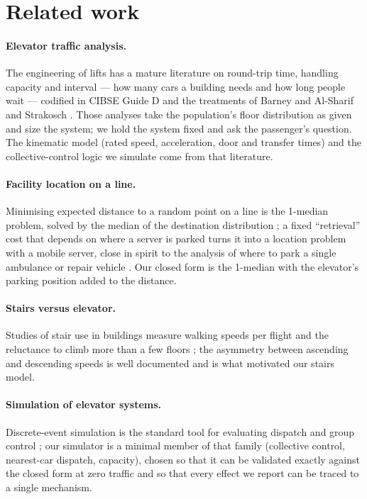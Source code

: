 \section{Related work}
\label{sec:related}

\paragraph{Elevator traffic analysis.} The engineering of lifts has a mature
literature on round-trip time, handling capacity and interval --- how many
cars a building needs and how long people wait --- codified in CIBSE Guide D
\cite{cibse2020guide} and the treatments of Barney and Al-Sharif
\cite{barney2015elevator} and Strakosch \cite{strakosch2010vertical}. Those
analyses take the population's floor distribution as given and size the
system; we hold the system fixed and ask the passenger's question. The
kinematic model (rated speed, acceleration, door and transfer times) and the
collective-control logic we simulate come from that literature.

\paragraph{Facility location on a line.} Minimising expected distance to a
random point on a line is the 1-median problem, solved by the median of the
destination distribution \cite{hakimi1964optimum}; a fixed ``retrieval''
cost that depends on where a server is parked turns it into a location problem
with a mobile server, close in spirit to the analysis of where to park a
single ambulance or repair vehicle \cite{larson1974hypercube}. Our closed
form is the 1-median with the elevator's parking position added to the
distance.

\paragraph{Stairs versus elevator.} Studies of stair use in buildings measure
walking speeds per flight and the reluctance to climb more than a few floors
\cite{fujiyama2010ascending}; the asymmetry between ascending and descending
speeds is well documented and is what motivated our stairs model.

\paragraph{Simulation of elevator systems.} Discrete-event simulation is the
standard tool for evaluating dispatch and group control
\cite{siikonen1993elevator}; our simulator is a minimal member of that family
(collective control, nearest-car dispatch, capacity), chosen so that it can be
validated exactly against the closed form at zero traffic and so that every
effect we report can be traced to a single mechanism.
